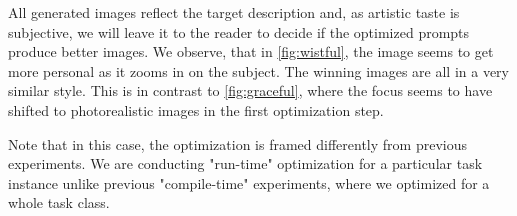 All generated images reflect the target description and, as artistic taste is subjective, we will leave it to the reader 
to decide if the optimized prompts produce better images. We observe, that in \ref{fig:wistful}, the image seems to get more personal as it zooms in on the subject.
The winning images are all in a very similar style. This is in contrast to \ref{fig:graceful}, where the focus seems to have shifted to 
photorealistic images in the first optimization step.

Note that in this case, the optimization is framed differently from previous experiments.
We are conducting "run-time" optimization for a particular task instance unlike previous "compile-time" experiments, where we optimized for a whole task class.
